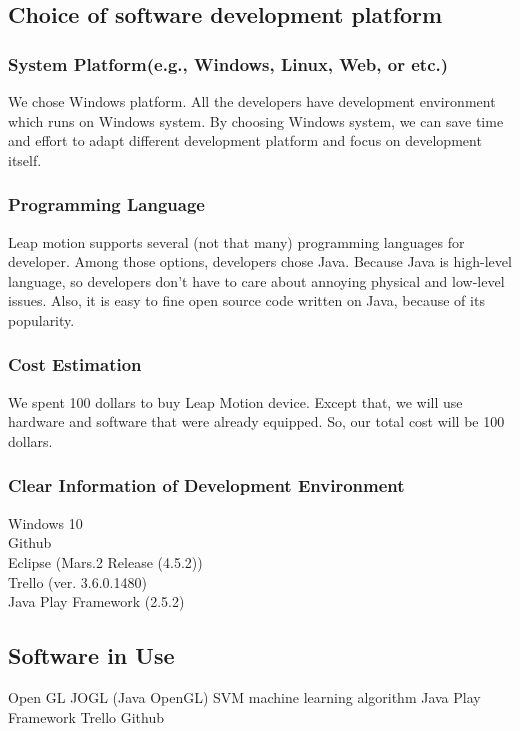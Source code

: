 \documentclass[10pt,journal,compsoc]{IEEEtran}
\begin{document}
\subsection{Choice of software development platform}

\subsubsection{System Platform(e.g., Windows, Linux, Web, or etc.)}

We chose Windows platform. All the developers have development environment which runs on Windows system. By choosing Windows system, we can save time and effort to adapt different development platform and focus on development itself.

\subsubsection{Programming Language}

Leap motion supports several (not that many) programming languages for developer. Among those options, developers chose Java. Because Java is high-level language, so developers don’t have to care about annoying physical and low-level issues. Also, it is easy to fine open source code written on Java, because of its popularity.

\subsubsection{Cost Estimation}

We spent 100 dollars to buy Leap Motion device. Except that, we will use hardware and software that were already equipped. So, our total cost will be 100 dollars.

\subsubsection{Clear Information of Development Environment}

Windows 10
\\Github
\\Eclipse (Mars.2 Release (4.5.2))
\\Trello (ver. 3.6.0.1480)
\\Java Play Framework (2.5.2)

\subsection{Software in Use}
Open GL
JOGL (Java OpenGL)
SVM machine learning algorithm
Java Play Framework
Trello
Github
\end{document}
